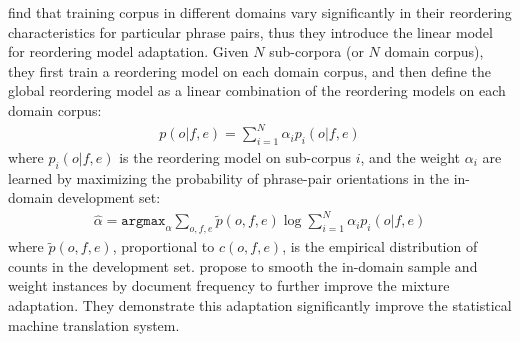 \citet{Chen-2013} find that training corpus in different domains vary significantly in their reordering characteristics for particular phrase pairs, thus they introduce the linear model for reordering model adaptation. Given $N$ sub-corpora (or $N$ domain corpus), they first train a reordering model on each domain corpus, and then define the global reordering model as a linear combination of the reordering models on each domain corpus:
\begin{align}
p(o|f,e) = \sum_{i=1}^{N} \alpha_i p_i(o|f,e)
\end{align}
where $p_i(o|f,e)$ is the reordering model on sub-corpus $i$, and the weight $\alpha_i$ are learned by maximizing the probability of phrase-pair orientations in the in-domain development set:
\begin{align}
\hat{\alpha} = \texttt{argmax}_{\alpha} \sum_{o,f,e} \tilde{p}(o,f,e) \log \sum_{i=1}^N \alpha_i p_i(o|f,e)
\end{align}
where $\tilde{p}(o,f,e)$, proportional to $c(o,f,e)$, is the empirical distribution of counts in the development set. \citet{Chen-2013} propose to smooth the in-domain sample and weight instances by document frequency to further improve the mixture adaptation. They demonstrate this adaptation significantly improve the statistical machine translation system.

